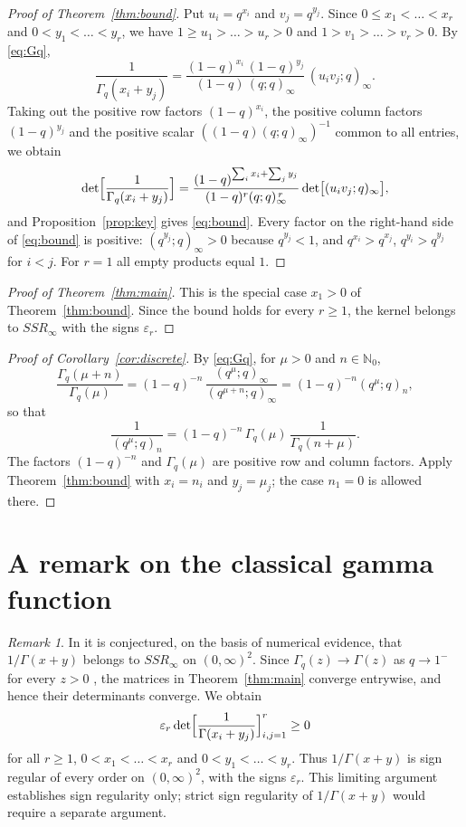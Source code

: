 \documentclass{amsart}
\theoremstyle{remark}
\newtheorem{remark}[theorem]{Remark}
\numberwithin{equation}{section}
\newcommand{\N}{\mathbb{N}}
\begin{document}
\begin{proof}[Proof of Theorem~\ref{thm:bound}]
Put $u_i=q^{x_i}$ and $v_j=q^{y_j}$. Since $0\le x_1<\dots<x_r$ and $0<y_1<\dots<y_r$, we have $1\ge u_1>\dots>u_r>0$ and $1>v_1>\dots>v_r>0$. By \eqref{eq:Gq},
\[
\frac{1}{\Gamma_q(x_i+y_j)}=\frac{(1-q)^{x_i}\,(1-q)^{y_j}}{(1-q)\,(q;q)_\infty}\,(u_iv_j;q)_\infty .
\]
Taking out the positive row factors $(1-q)^{x_i}$, the positive column factors $(1-q)^{y_j}$ and the positive scalar $((1-q)(q;q)_\infty)^{-1}$ common to all entries, we obtain
\[
\det\Bigl[\frac{1}{\Gamma_q(x_i+y_j)}\Bigr]=\frac{(1-q)^{\sum_ix_i+\sum_jy_j}}{(1-q)^r(q;q)_\infty^{\,r}}\det\bigl[(u_iv_j;q)_\infty\bigr],
\]
and Proposition~\ref{prop:key} gives \eqref{eq:bound}. Every factor on the right-hand side of \eqref{eq:bound} is positive: $(q^{y_j};q)_\infty>0$ because $q^{y_j}<1$, and $q^{x_i}>q^{x_j}$, $q^{y_i}>q^{y_j}$ for $i<j$. For $r=1$ all empty products equal $1$.
\end{proof}

\begin{proof}[Proof of Theorem~\ref{thm:main}]
This is the special case $x_1>0$ of Theorem~\ref{thm:bound}. Since the bound holds for every $r\ge1$, the kernel belongs to $SSR_\infty$ with the signs $\varepsilon_r$.
\end{proof}

\begin{proof}[Proof of Corollary~\ref{cor:discrete}]
By \eqref{eq:Gq}, for $\mu>0$ and $n\in\N_0$,
\[
\frac{\Gamma_q(\mu+n)}{\Gamma_q(\mu)}=(1-q)^{-n}\,\frac{(q^\mu;q)_\infty}{(q^{\mu+n};q)_\infty}=(1-q)^{-n}(q^\mu;q)_n ,
\]
so that
\[
\frac{1}{(q^{\mu};q)_n}=(1-q)^{-n}\,\Gamma_q(\mu)\,\frac{1}{\Gamma_q(n+\mu)} .
\]
The factors $(1-q)^{-n}$ and $\Gamma_q(\mu)$ are positive row and column factors. Apply Theorem~\ref{thm:bound} with $x_i=n_i$ and $y_j=\mu_j$; the case $n_1=0$ is allowed there.
\end{proof}

\section{A remark on the classical gamma function}\label{sec:remarks}

\begin{remark}
In \cite[Section~3, Example~6]{KVZ} it is conjectured, on the basis of numerical evidence, that $1/\Gamma(x+y)$ belongs to $SSR_\infty$ on $(0,\infty)^2$. Since $\Gamma_q(z)\to\Gamma(z)$ as $q\to1^-$ for every $z>0$ \cite[Section~1.10]{GR}, the matrices in Theorem~\ref{thm:main} converge entrywise, and hence their determinants converge. We obtain
\[
\varepsilon_r\det\Bigl[\frac{1}{\Gamma(x_i+y_j)}\Bigr]_{i,j=1}^r\ge0
\]
for all $r\ge1$, $0<x_1<\dots<x_r$ and $0<y_1<\dots<y_r$. Thus $1/\Gamma(x+y)$ is sign regular of every order on $(0,\infty)^2$, with the signs $\varepsilon_r$. This limiting argument establishes sign regularity only; strict sign regularity of $1/\Gamma(x+y)$ would require a separate argument.
\end{remark}
\end{document}
